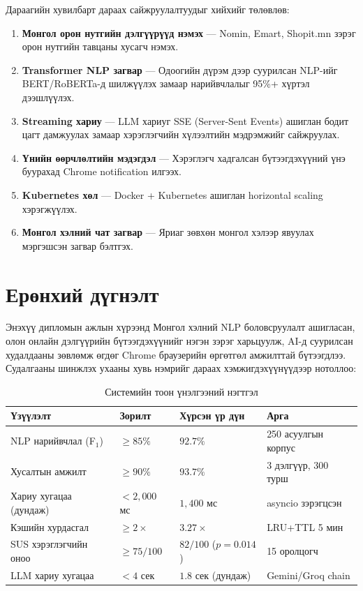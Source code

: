 \documentclass[12pt,a4paper]{report}
\begin{document}
Дараагийн хувилбарт дараах сайжруулалтуудыг хийхийг төлөвлөв:

\begin{enumerate}[leftmargin=1.5cm]
  \item \textbf{Монгол орон нутгийн дэлгүүрүүд нэмэх} --- Nomin, Emart, Shopit.mn зэрэг орон нутгийн тавцаны хусагч нэмэх.
  \item \textbf{Transformer NLP загвар} --- Одоогийн дүрэм дээр суурилсан NLP-ийг BERT/RoBERTa-д шилжүүлэх замаар нарийвчлалыг 95\%+ хүртэл дээшлүүлэх.
  \item \textbf{Streaming хариу} --- LLM хариуг SSE (Server-Sent Events) ашиглан бодит цагт дамжуулах замаар хэрэглэгчийн хүлээлтийн мэдрэмжийг сайжруулах.
  \item \textbf{Үнийн өөрчлөлтийн мэдэгдэл} --- Хэрэглэгч хадгалсан бүтээгдэхүүний үнэ буурахад Chrome notification илгээх.
  \item \textbf{Kubernetes хөл} --- Docker + Kubernetes ашиглан horizontal scaling хэрэгжүүлэх.
  \item \textbf{Монгол хэлний чат загвар} --- Яриаг зөвхөн монгол хэлээр явуулах мэргэшсэн загвар бэлтгэх.
\end{enumerate}

\section{Ерөнхий дүгнэлт}

Энэхүү дипломын ажлын хүрээнд Монгол хэлний NLP боловсруулалт ашигласан, олон онлайн дэлгүүрийн бүтээгдэхүүнийг нэгэн зэрэг харьцуулж, AI-д суурилсан худалдааны зөвлөмж өгдөг Chrome браузерийн өргөтгөл амжилттай бүтээгдлээ. Судалгааны шинжлэх ухааны хувь нэмрийг дараах хэмжигдэхүүнүүдээр нотоллоо:

\begin{table}[H]
\centering
\caption{Системийн тоон үнэлгээний нэгтгэл}
\label{tab:final_summary}
\begin{tabularx}{\textwidth}{@{}lXXX@{}}
\toprule
\textbf{Үзүүлэлт} & \textbf{Зорилт} & \textbf{Хүрсэн үр дүн} & \textbf{Арга} \\
\midrule
NLP нарийвчлал (F$_1$) & $\geq 85\%$ & $92.7\%$ & 250 асуулгын корпус \\
Хусалтын амжилт & $\geq 90\%$ & $93.7\%$ & 3 дэлгүүр, 300 турш \\
Хариу хугацаа (дундаж) & $< 2{,}000$ мс & $1{,}400$ мс & asyncio зэрэгцсэн \\
Кэшийн хурдасгал & $\geq 2\times$ & $3.27\times$ & LRU+TTL 5 мин \\
SUS хэрэглэгчийн оноо & $\geq 75/100$ & $82/100$ ($p=0.014$) & 15 оролцогч \\
LLM хариу хугацаа & $< 4$ сек & $1.8$ сек (дундаж) & Gemini/Groq chain \\
\bottomrule
\end{tabularx}
\end{table}
\end{document}

